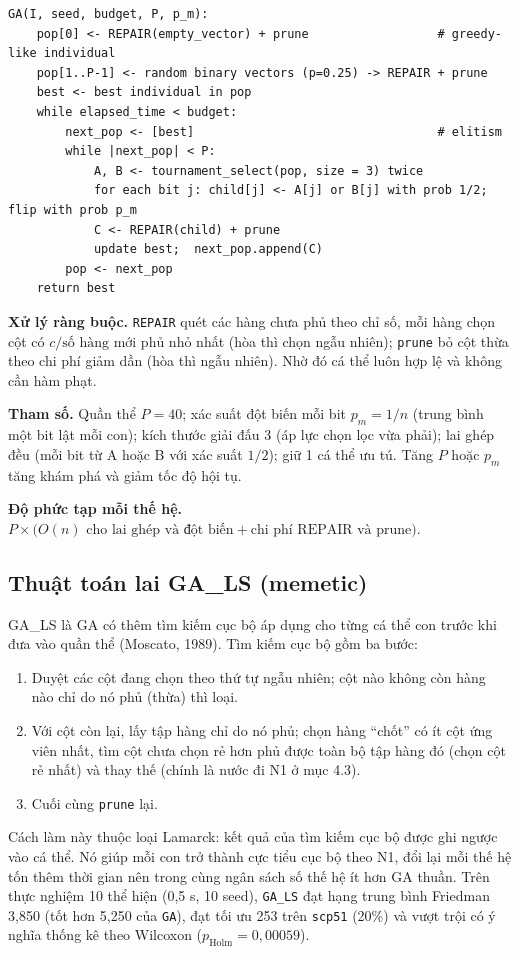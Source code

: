 \documentclass[a4paper,12pt]{article}
\begin{document}
\begin{Verbatim}
GA(I, seed, budget, P, p_m):
    pop[0] <- REPAIR(empty_vector) + prune                  # greedy-like individual
    pop[1..P-1] <- random binary vectors (p=0.25) -> REPAIR + prune
    best <- best individual in pop
    while elapsed_time < budget:
        next_pop <- [best]                                  # elitism
        while |next_pop| < P:
            A, B <- tournament_select(pop, size = 3) twice
            for each bit j: child[j] <- A[j] or B[j] with prob 1/2; flip with prob p_m
            C <- REPAIR(child) + prune
            update best;  next_pop.append(C)
        pop <- next_pop
    return best
\end{Verbatim}

\textbf{Xử lý ràng buộc.} \texttt{REPAIR} quét các hàng chưa phủ theo chỉ số, mỗi hàng chọn cột có $c/\text{số hàng mới phủ}$ nhỏ nhất (hòa thì chọn ngẫu nhiên); \texttt{prune} bỏ cột thừa theo chi phí giảm dần (hòa thì ngẫu nhiên). Nhờ đó cá thể luôn hợp lệ và không cần hàm phạt.

\textbf{Tham số.} Quần thể $P=40$; xác suất đột biến mỗi bit $p_m=1/n$ (trung bình một bit lật mỗi con); kích thước giải đấu 3 (áp lực chọn lọc vừa phải); lai ghép đều (mỗi bit từ A hoặc B với xác suất $1/2$); giữ 1 cá thể ưu tú. Tăng $P$ hoặc $p_m$ tăng khám phá và giảm tốc độ hội tụ.

\textbf{Độ phức tạp mỗi thế hệ.} $P\times\bigl(O(n)\text{ cho lai ghép và đột biến}+\text{chi phí REPAIR và prune}\bigr)$.

\subsection{Thuật toán lai GA\_LS (memetic)}
GA\_LS là GA có thêm tìm kiếm cục bộ áp dụng cho từng cá thể con trước khi đưa vào quần thể (Moscato, 1989). Tìm kiếm cục bộ gồm ba bước:
\begin{enumerate}
\item Duyệt các cột đang chọn theo thứ tự ngẫu nhiên; cột nào không còn hàng nào chỉ do nó phủ (thừa) thì loại.
\item Với cột còn lại, lấy tập hàng chỉ do nó phủ; chọn hàng ``chốt'' có ít cột ứng viên nhất, tìm cột chưa chọn rẻ hơn phủ được toàn bộ tập hàng đó (chọn cột rẻ nhất) và thay thế (chính là nước đi N1 ở mục 4.3).
\item Cuối cùng \texttt{prune} lại.
\end{enumerate}
Cách làm này thuộc loại Lamarck: kết quả của tìm kiếm cục bộ được ghi ngược vào cá thể. Nó giúp mỗi con trở thành cực tiểu cục bộ theo N1, đổi lại mỗi thế hệ tốn thêm thời gian nên trong cùng ngân sách số thế hệ ít hơn GA thuần. Trên thực nghiệm 10 thể hiện (0,5 s, 10 seed), \texttt{GA\_LS} đạt hạng trung bình Friedman 3,850 (tốt hơn 5,250 của \texttt{GA}), đạt tối ưu 253 trên \texttt{scp51} (20\%) và vượt trội có ý nghĩa thống kê theo Wilcoxon ($p_{\mathrm{Holm}} = 0{,}00059$).
\end{document}
